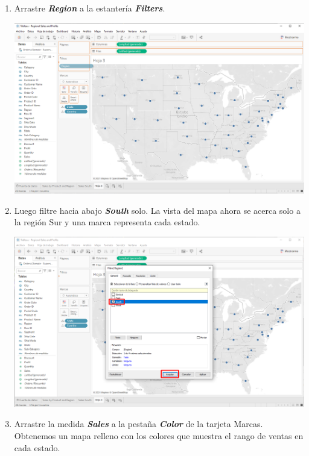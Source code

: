 \documentclass[12pt,letterpaper]{article}
\begin{document}
\begin{enumerate}
\begin{center}
        \end{center}
        \item Arrastre \textit{\textbf{Region}} a la estantería \textit{\textbf{Filters}}.
        \begin{center}
            \includegraphics[width=15cm]{./img/img34.png}
        \end{center}
        \item Luego filtre hacia abajo \textit{\textbf{South}} solo. La vista del mapa ahora se acerca solo a la región Sur y una marca representa cada estado.
        \begin{center}
            \includegraphics[width=15cm]{./img/img35.png}
        \end{center}
        \item Arrastre la medida \textit{\textbf{Sales}} a la pestaña \textit{\textbf{Color}} de la tarjeta Marcas. Obtenemos un mapa relleno con los colores que muestra el rango de ventas en cada estado.
        \begin{center}

\end{center}
\end{enumerate}
\end{document}
